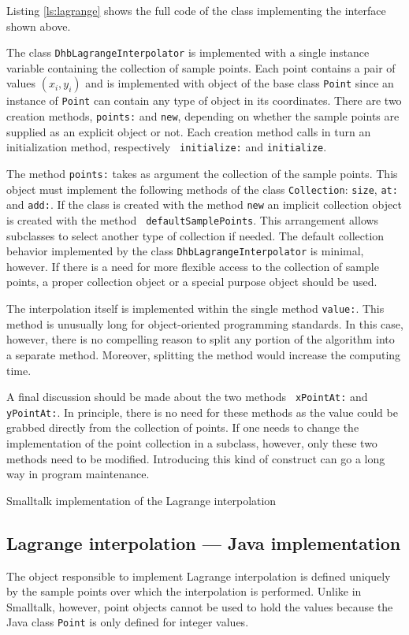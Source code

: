 \documentclass[twoside]{book}
\begin{document}
Listing \ref{ls:lagrange} shows the full code of the class
implementing the interface shown above.

The class {\tt DhbLagrangeInterpolator} is implemented with a
single instance variable containing the collection of sample
points. Each point contains a pair of values
$\left(x_i,y_i\right)$ and is implemented with object of the base
class {\tt Point} since an instance of {\tt Point} can contain any
type of object in its coordinates. There are two creation methods,
{\tt points:} and {\tt new}, depending on whether the sample
points are supplied as an explicit object or not. Each creation
method calls in turn an initialization method, respectively {\tt
initialize:} and {\tt initialize}.

The method {\tt points:} takes as argument the collection of the
sample points. This object must implement the following methods of
the class {\tt Collection}: {\tt size}, {\tt at:} and {\tt add:}.
If the class is created with the method {\tt new} an implicit
collection object is created with the method {\tt
defaultSamplePoints}. This arrangement allows subclasses to select
another type of collection if needed. The default collection
behavior implemented by the class {\tt DhbLagrangeInterpolator} is
minimal, however. If there is a need for more flexible access to
the collection of sample points, a proper collection object or a
special purpose object should be used.

The interpolation itself is implemented within the single method
{\tt value:}. This method is unusually long for object-oriented
programming standards. In this case, however, there is no
compelling reason to split any portion of the algorithm into a
separate method. Moreover, splitting the method would increase the
computing time.

A final discussion should be made about the two methods {\tt
xPointAt:} and {\tt yPointAt:}. In principle, there is no need for
these methods as the value could be grabbed directly from the
collection of points. If one needs to change the implementation of
the point collection in a subclass, however, only these two
methods need to be modified. Introducing this kind of construct
can go a long way in program maintenance.
\begin{listing}
Smalltalk implementation of the Lagrange interpolation
\label{ls:lagrange}

\end{listing}

\subsection{Lagrange interpolation --- Java implementation}
\label{sec:jlagrange} The object
responsible to implement Lagrange interpolation is defined
uniquely by the sample points over which the interpolation is
performed. Unlike in Smalltalk, however, point objects cannot be
used to hold the values because the Java class {\tt Point} is only
defined for integer values.
\end{document}

